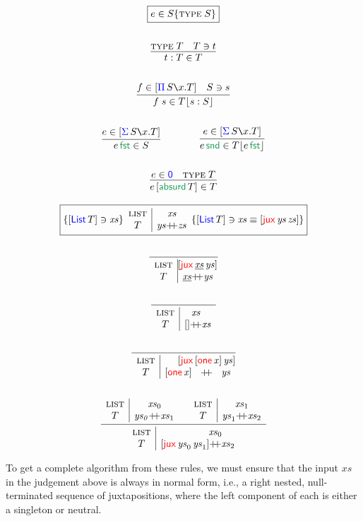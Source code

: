 \documentclass[12pt, a4paper]{article}
\makeatletter
\newcommand{\bsl}{\texttt{\symbol{92}}}
\newcommand{\Type}{\textsc{type}\;}
\newcommand{\Zero}{\single{\D{0}}}
\newcommand{\Nil}{\mathbf{[]}}
\newcommand{\fst}{\mathsf{fst}}
\newcommand{\snd}{\mathsf{snd}}
\newcommand{\gp}{\,}
\newcommand{\forms}[3]{
  \ifthenelse{\equal{{#2}}{}}
  {\textcolor{#3}{\gp {#1}}}
  {[\textcolor{#3}{#1}\gp {#2}]}
}
\newcommand{\typeIntro}[2]{\forms{#1}{#2}{blue}}
\newcommand{\elim}[2]{\forms{#1}{#2}{ForestGreen}}
\newcommand{\elimOne}[1]{\gp \textcolor{ForestGreen}{#1}}
\newcommand{\absurd}[1]{\elim{\mathsf{absurd}}{#1}}
\newcommand{\subst}[2]{{#1}\lfloor {#2} \rfloor}
\newcommand{\C}[1]{\textcolor{red}{\mathsf{#1}}}
\newcommand{\D}[1]{\textcolor{blue}{\mathsf{#1}}}
\newcommand{\one}[1]{[ \C{one} \gp  {#1} ]}
\newcommand{\List}[1]{[ \D{List} \gp {#1} ]}
\newcommand{\jux}[2]{[ \C{jux} \gp {#1} \gp {#2}]}
\newcommand{\checkType}[2]{{#1} \ni {#2}}
\newcommand{\synthType}[2]{{#1} \in {#2}}
\newcommand{\chopList}[4]{
  \begin{array}{c|c@{}c@{}c}
    \textsc{list}&& \hspace*{-0.5cm}{#2}\hspace*{-0.5cm} &  \\
    {#1} & {#3} & +\!\!+ & {#4}
  \end{array}
}
\newcommand{\neu}[1]{\underline{#1}}
\newcommand{\V}[1]{\mathit{#1}}
\newcommand{\single}[1]{#1}
\makeatother
\begin{document}
\begin{gather*}
  \fbox{$ e \in S \{\Type S\}$}
  \\ \\
  \infer{t : T \in T}{\Type T & T \ni t}
  \\ \\
  \infer{f\; s \in \subst{T}{s : S}}{f \in \typeIntro{\Pi}{S \bsl x . T} & S \ni s}
  \\ \\
  \infer{e \elimOne{\fst} \in S}{e \in \typeIntro{\Sigma}{S \bsl x. T}}
  \qquad\qquad
  \infer{e \elimOne{\snd} \in \subst{T}{e \elimOne{\fst} }}{e \in \typeIntro{\Sigma}{S \bsl x. T}}
  \\ \\
  \infer{\synthType{e \gp \absurd{T}}{T}}{e \in \Zero & \Type T}
\end{gather*}


\begin{gather*}
  \fbox{$ \{ \checkType{\List{T}}{\V{xs}} \}
          \chopList{T}{\V{xs}}{\V{ys}}{\V{zs}}
       \{ \checkType{\List{T}}{\V{xs}\equiv\jux{\V{ys}}{\V{zs}}} \}
       $}
  \\  \\
  \infer
    {\chopList{T}{\jux{\neu{\V{xs}}}{\V{ys}}}{\neu{\V{xs}}}{\V{ys}}}
    {}
  \\  \\
  \infer
    {\chopList{T}{\V{xs}}{\Nil}{\V{xs}}}
    {}
  \\  \\
  \infer
    {\chopList{T}{\jux{\one{\V{x}}}{\V{ys}}}{\one{\V{x}}}{\V{ys}}}
    {}
  \\  \\
  \infer
    {\chopList{T}{\V{xs}_{0}}{\jux{\V{ys}_{0}}{\V{ys}_{1}}}{\V{xs}_{2}}}
    {\chopList{T}{\V{xs}_{0}}{\V{ys_{0}}}{\V{xs}_{1}} &
    \chopList{T}{\V{xs}_{1}}{\V{ys}_{1}}{\V{xs}_{2}} }
\end{gather*}

To get a complete algorithm from these rules, we must ensure that the input $\V{xs}$ in the judgement above is always in normal form, i.e., a right nested, null-terminated sequence of juxtapositions, where the left component of each is either a singleton or neutral.
\end{document}
